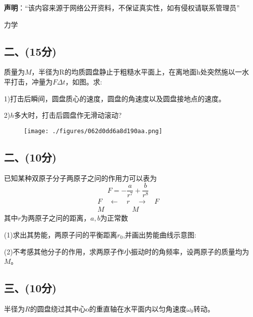 
\textbf{声明}：“该内容来源于网络公开资料，不保证真实性，如有侵权请联系管理员”

力学
\subsection{二、(15分)}
质量为$M$，半径为R的均质圆盘静止于粗糙水平面上，在离地面h处突然施以一水平打击，冲量为$F\Delta t$，如图。求:

1)打击后瞬间，圆盘质心的速度，圆盘的角速度以及圆盘接地点的速度。

2)$h$多大时，打击后圆盘作无滑动滚动?
\begin{figure}[ht]
\centering
\texttt{[image: ./figures/062d0dd6a8d190aa.png]}
\caption{} \label{fig_PKU199_1}
\end{figure}
\subsection{二、(10分)}
已知某种双原子分子两原子之问的作用力可以表为
$$F = -\frac{a}{r^7} + \frac{b}{r^8}~$$
$$\begin{array}{c}
F \quad \longleftarrow \quad r \quad \longrightarrow \quad F \\
M \quad \quad \quad \quad M 
\end{array}~$$
其中$r$为两原子之问的距离，$a,b$为正常数

(1)求出其势能，两原子问的平衡距离$r_0$,并画出势能曲线示意图:

(2)不考感其他分子的作用，求两原子作小振动时的角频率，设两原子的质量均为$M$。
\subsection{三、(10分)}
半径为$R$的圆盘绕过其中心o的重直轴在水平面内以匀角速度$\omega_0$转动。
